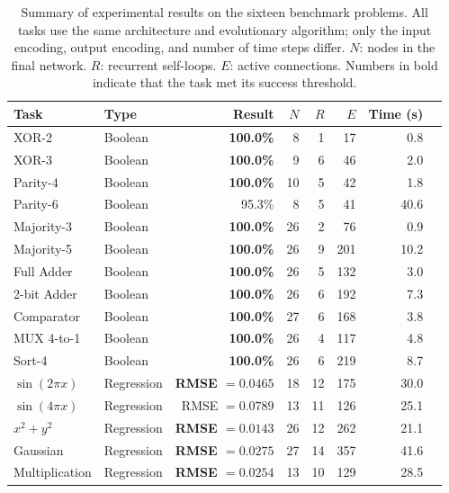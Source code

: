 \begin{table}[h]
  \centering
  \small
  \caption{Summary of experimental results on the sixteen benchmark
    problems. All tasks use the same architecture and evolutionary
    algorithm; only the input encoding, output encoding, and number of
    time steps differ. $N$: nodes in the final network.
    $R$: recurrent self-loops. $E$: active connections.
    Numbers in bold indicate that the task met its success threshold.}
  \label{tab:main-results}
  \begin{tabular}{llrrrrrr}
    \toprule
    \textbf{Task} & \textbf{Type} & \textbf{Result} & $N$ & $R$ & $E$ & \textbf{Time (s)} \\
    \midrule
    XOR-2        & Boolean    & \textbf{100.0\%}    &  8 &  1 &  17 &  0.8 \\
    XOR-3        & Boolean    & \textbf{100.0\%}    &  9 &  6 &  46 &  2.0 \\
    Parity-4     & Boolean    & \textbf{100.0\%}    & 10 &  5 &  42 &  1.8 \\
    Parity-6     & Boolean    & 95.3\%              &  8 &  5 &  41 & 40.6 \\
    Majority-3   & Boolean    & \textbf{100.0\%}    & 26 &  2 &  76 &  0.9 \\
    Majority-5   & Boolean    & \textbf{100.0\%}    & 26 &  9 & 201 & 10.2 \\
    Full Adder   & Boolean    & \textbf{100.0\%}    & 26 &  5 & 132 &  3.0 \\
    2-bit Adder  & Boolean    & \textbf{100.0\%}    & 26 &  6 & 192 &  7.3 \\
    Comparator   & Boolean    & \textbf{100.0\%}    & 27 &  6 & 168 &  3.8 \\
    MUX 4-to-1   & Boolean    & \textbf{100.0\%}    & 26 &  4 & 117 &  4.8 \\
    Sort-4       & Boolean    & \textbf{100.0\%}    & 26 &  6 & 219 &  8.7 \\
    \midrule
    $\sin(2\pi x)$  & Regression & \textbf{RMSE $=0.0465$} & 18 & 12 & 175 & 30.0 \\
    $\sin(4\pi x)$  & Regression & RMSE $=0.0789$          & 13 & 11 & 126 & 25.1 \\
    $x^2 + y^2$     & Regression & \textbf{RMSE $=0.0143$} & 26 & 12 & 262 & 21.1 \\
    Gaussian        & Regression & \textbf{RMSE $=0.0275$} & 27 & 14 & 357 & 41.6 \\
    Multiplication  & Regression & \textbf{RMSE $=0.0254$} & 13 & 10 & 129 & 28.5 \\
    \bottomrule
  \end{tabular}
\end{table}

